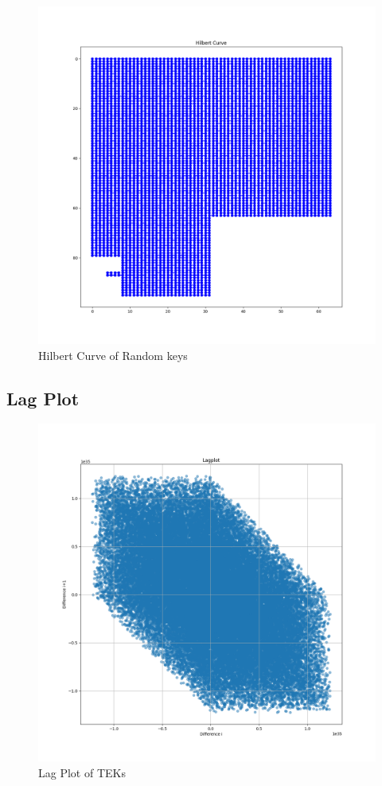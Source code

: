 \begin{figure}[H]
\centering
\includegraphics[width=1\textwidth]{hilbertCurverands.png}
\caption{Hilbert Curve of Random keys}
\label{fig:hilbertrands}
\end{figure}

\subsection{Lag Plot}


\begin{figure}[H]
\centering
\includegraphics[width=1\textwidth]{lagplotteks50k.png}
\caption{Lag Plot of TEKs}
\label{fig:lagplotteks}
\end{figure}

